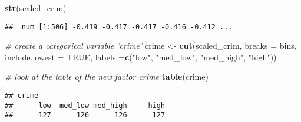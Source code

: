 \documentclass[
]{article}
\newenvironment{Shaded}{\begin{snugshade}}{\end{snugshade}}
\newcommand{\CommentTok}[1]{\textcolor[rgb]{0.56,0.35,0.01}{\textit{#1}}}
\newcommand{\DataTypeTok}[1]{\textcolor[rgb]{0.13,0.29,0.53}{#1}}
\newcommand{\KeywordTok}[1]{\textcolor[rgb]{0.13,0.29,0.53}{\textbf{#1}}}
\newcommand{\NormalTok}[1]{#1}
\newcommand{\OtherTok}[1]{\textcolor[rgb]{0.56,0.35,0.01}{#1}}
\newcommand{\StringTok}[1]{\textcolor[rgb]{0.31,0.60,0.02}{#1}}
\begin{document}
\begin{Shaded}
\begin{Highlighting}[]
\KeywordTok{str}\NormalTok{(scaled_crim)}
\end{Highlighting}
\end{Shaded}

\begin{verbatim}
##  num [1:506] -0.419 -0.417 -0.417 -0.416 -0.412 ...
\end{verbatim}

\begin{Shaded}
\begin{Highlighting}[]
\CommentTok{# create a categorical variable 'crime'}
\NormalTok{crime <-}\StringTok{ }\KeywordTok{cut}\NormalTok{(scaled_crim, }\DataTypeTok{breaks =}\NormalTok{ bins, }\DataTypeTok{include.lowest =} \OtherTok{TRUE}\NormalTok{, labels}
\NormalTok{=}\KeywordTok{c}\NormalTok{(}\StringTok{"low"}\NormalTok{, }\StringTok{"med_low"}\NormalTok{, }\StringTok{"med_high"}\NormalTok{, }\StringTok{"high"}\NormalTok{))}

\CommentTok{# look at the table of the new factor crime}
\KeywordTok{table}\NormalTok{(crime)}
\end{Highlighting}
\end{Shaded}

\begin{verbatim}
## crime
##      low  med_low med_high     high 
##      127      126      126      127
\end{verbatim}
\end{document}

